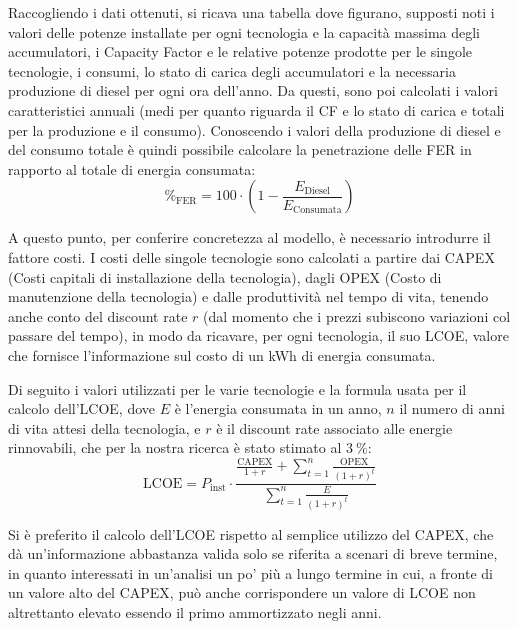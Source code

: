 \documentclass[fleqn,11pt]{SelfArx} %
\begin{document}
Raccogliendo i dati ottenuti, si ricava una tabella dove figurano, supposti noti i valori delle potenze installate per ogni tecnologia e la capacità massima degli accumulatori, i Capacity Factor e le relative potenze prodotte per le singole tecnologie, i consumi, lo stato di carica degli accumulatori e la necessaria produzione di diesel per ogni ora dell'anno.
Da questi, sono poi calcolati i valori caratteristici annuali (medi per quanto riguarda il CF e lo stato di carica e totali per la produzione e il consumo).
Conoscendo i valori della produzione di diesel e del consumo totale è quindi possibile calcolare la penetrazione delle FER in rapporto al totale di energia consumata:
\begin{equation}
	\%_\text{FER} = 100 \cdot \left(1 - \frac{E_{\text{Diesel}}}{E_{\text{Consumata}}}\right)
\end{equation}

A questo punto, per conferire concretezza al modello, è necessario introdurre il fattore costi.
I costi delle singole tecnologie sono calcolati a partire dai CAPEX (Costi capitali di installazione della tecnologia), dagli OPEX (Costo di manutenzione della tecnologia) e dalle produttività nel tempo di vita, tenendo anche conto del discount rate \(r\) (dal momento che i prezzi subiscono variazioni col passare del tempo), in modo da ricavare, per ogni tecnologia, il suo LCOE, valore che fornisce l'informazione sul costo di un kWh di energia consumata.

Di seguito i valori utilizzati per le varie tecnologie e la formula usata per il calcolo dell'LCOE, dove \(E\) è l'energia consumata in un anno, \(n\) il numero di anni di vita attesi della tecnologia, e \(r\) è il discount rate associato alle energie rinnovabili, che per la nostra ricerca è stato stimato al \(\SI{3}{\percent}\):
\begin{equation}
	\text{LCOE} =
		P_\text{inst} \cdot \frac{\frac{\text{CAPEX}}{1+r} + \sum\limits_{t=1}^n \frac{\text{OPEX}}{(1+r)^t}}{\sum\limits_{t=1}^n \frac{E}{(1+r)^t}}
	\label{eq:lcoe}
\end{equation}

Si è preferito il calcolo dell'LCOE rispetto al semplice utilizzo del CAPEX, che dà un'informazione abbastanza valida solo se riferita a scenari di breve termine, in quanto interessati in un'analisi un po' più a lungo termine in cui, a fronte di un valore alto del CAPEX, può anche corrispondere un valore di LCOE non altrettanto elevato essendo il primo ammortizzato negli anni.
\end{document}
